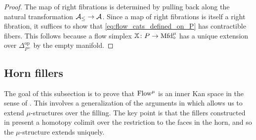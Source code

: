 \documentclass[10pt]{amsart}
\numberwithin{equation}{section}
\theoremstyle{definition}
\DeclareMathOperator{\op}{op}
\newcommand{\PreFlow}{\mathrm{Flow}\vphantom{w}}
\newcommand{\Mfd}{\mathrm{Mfd}\vphantom{d}}
\newcommand{\bX}{\mathbb{X}}
\newcommand{\Simp}{\mathbb{\Delta}}
\newcommand{\cA}{\mathcal{A}}
\renewcommand{\to}{\mathchoice{\longrightarrow}{\rightarrow}{}{}}
\begin{document}
\begin{proof}
	The map of right fibrations is determined by pulling back along the natural transformation $\cA_{\leq} \to \cA$.
  Since a map of right fibrations is itself a right fibration, it suffices to show that \eqref{eq:flow_cats_defined_on_P} has contractible fibers.
  This follows because a flow simplex $\bX\colon P \to \Mfd^{\mu}_{\diamond}$ has a unique extension over $\Simp^{\op}_{P^{\simeq}}$ by the empty manifold.
\end{proof}


\subsection{Horn fillers}\label{subsec:horn_fillers}
The goal of this subsection is to prove that $\PreFlow^{\mu}$ is an inner Kan space in the sense of .
This involves a generalization of the arguments in \cite[Section 5]{AB} which allows us to extend $\mu$-structures over the filling.
The key point is that the fillers constructed in \cite{AB} present a homotopy colimit over the restriction to the faces in the horn, and so the $\mu$-structure extends uniquely.
\end{document}
